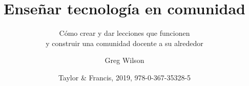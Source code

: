 \documentclass[]{../tex/krantz}
\begin{document}
\title{Enseñar tecnología en comunidad}
\subtitle{Cómo crear y dar lecciones que funcionen \\ y construir una comunidad docente a su alrededor}
\author{Greg Wilson}
\date{Taylor \& Francis, 2019, 978-0-367-35328-5}
\maketitle

\frontmatter

\tableofcontents



\mainmatter
















\cleardoublepage

\printbibliography

\appendix










\printindex
\end{document}
